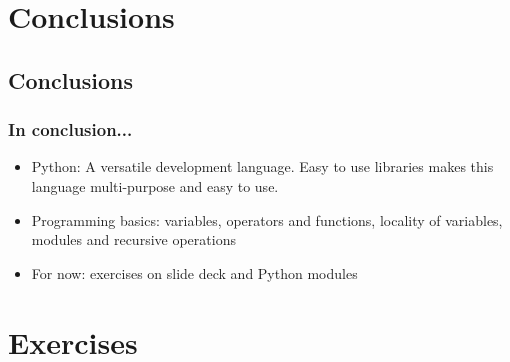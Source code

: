  




\section{Conclusions}
\subsection*{Conclusions}
\begin{frame}[fragile]
  \frametitle{In conclusion...}
  \begin{itemize}
     \item Python: A versatile development language. Easy to use libraries makes this language multi-purpose and easy to use.
     \item Programming basics: variables, operators and functions, locality of variables, modules and recursive operations
  \end{itemize}
  \pause
    \begin{itemize}
     \item For now: exercises on slide deck and Python modules
  \end{itemize}
\end{frame}

\section{Exercises}
